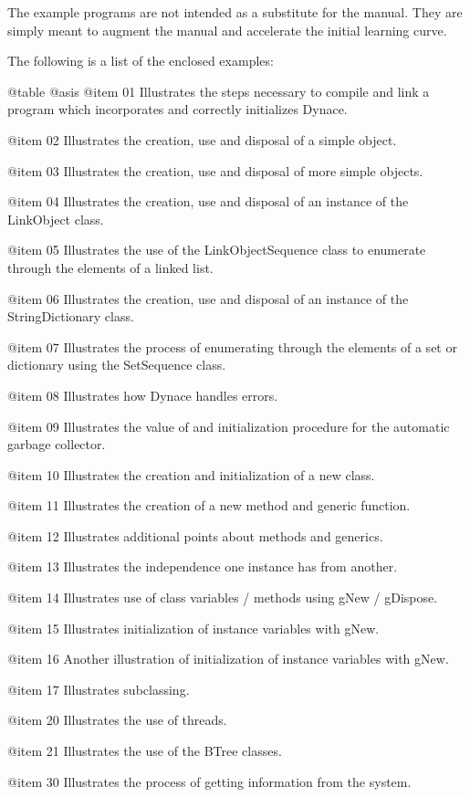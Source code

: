 The example programs are not intended as a substitute for the manual.
They are simply meant to augment the manual and accelerate the initial
learning curve.

The following is a list of the enclosed examples:

@table @asis
@item 01
Illustrates the steps necessary to compile and link a program which
incorporates and correctly initializes Dynace.

@item 02
Illustrates the creation, use and disposal of a simple object.

@item 03
Illustrates the creation, use and disposal of more simple objects.

@item 04
Illustrates the creation, use and disposal of an instance of the
LinkObject class.

@item 05
Illustrates the use of the LinkObjectSequence class to enumerate through
the elements of a linked list.

@item 06
Illustrates the creation, use and disposal of an instance of the
StringDictionary class.

@item 07
Illustrates the process of enumerating through the elements of a
set or dictionary using the SetSequence class.

@item 08
Illustrates how Dynace handles errors.

@item 09
Illustrates the value of and initialization procedure for the automatic
garbage collector.

@item 10
Illustrates the creation and initialization of a new class.

@item 11
Illustrates the creation of a new method and generic function.

@item 12
Illustrates additional points about methods and generics.

@item 13
Illustrates the independence one instance has from another.

@item 14
Illustrates use of class variables / methods using gNew / gDispose.

@item 15
Illustrates initialization of instance variables with gNew.

@item 16
Another illustration of initialization of instance variables with gNew.

@item 17
Illustrates subclassing.

@item 20
Illustrates the use of threads.

@item 21
Illustrates the use of the BTree classes.

@item 30
Illustrates the process of getting information from the system.

